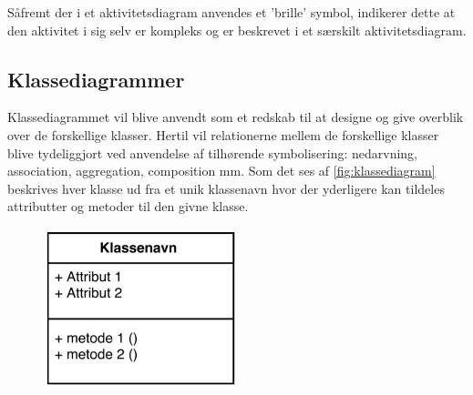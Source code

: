 Såfremt der i et aktivitetsdiagram anvendes et 'brille' symbol, indikerer dette at den aktivitet i sig selv er kompleks og er beskrevet i et særskilt aktivitetsdiagram.  

\subsection{Klassediagrammer}
Klassediagrammet vil blive anvendt som et redskab til at designe og give overblik over de forskellige klasser. Hertil vil relationerne mellem de forskellige klasser blive tydeliggjort ved anvendelse af tilhørende symbolisering: nedarvning, association, aggregation, composition mm. Som det ses af \autoref{fig:klassediagram} beskrives hver klasse ud fra et unik klassenavn hvor der yderligere kan tildeles attributter og metoder til den givne klasse.  

\begin{figure} [H]
\centering
\includegraphics[width=0.5\textwidth]{figures/klassediag}
\caption{}
\label{fig:klassediagram}
\end{figure}